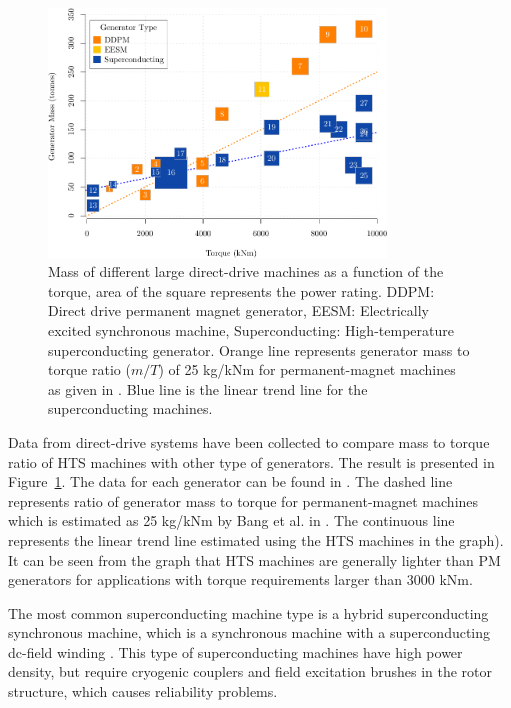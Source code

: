 \documentclass[a4paper, 11pt]{article} %
\begin{document}
 \begin{figure}[t]
    \centering
    \includegraphics[width=0.8\textwidth]{generator_mass_compare}
\caption{Mass of different large direct-drive machines as a function of the torque, area of the square represents the power rating.
 DDPM: Direct drive permanent magnet generator, EESM: Electrically excited synchronous machine, Superconducting: High-temperature superconducting generator. Orange line represents generator mass to torque ratio ($m/T$) of 25 kg/kNm for permanent-magnet machines as given in \cite{Bang2008}. Blue line is the linear trend line for the superconducting machines.}
    \label{generator_mass_compare}
  \end{figure}

Data from direct-drive systems have been collected to compare mass to torque ratio of HTS machines with other type of generators. The result is presented in Figure~\ref{generator_mass_compare}. The data for each generator can be found in \cite{Keysan2011b}. The dashed line represents ratio of generator mass to torque for permanent-magnet machines which is estimated as 25 kg/kNm by Bang et al. in \cite{Bang2008}. The continuous line represents the linear trend line estimated using the HTS machines in the graph). It can be seen from the graph that HTS machines are generally lighter than PM generators for applications with torque requirements larger than 3000 kNm. 


The most common superconducting machine type is a hybrid superconducting synchronous machine, which is a synchronous machine with a superconducting dc-field winding \cite{Kalsi2004a,Gieras2008a}.  This type of superconducting machines have high power density, but require cryogenic couplers and field excitation brushes in the rotor structure, which causes reliability problems. 
\end{document}
